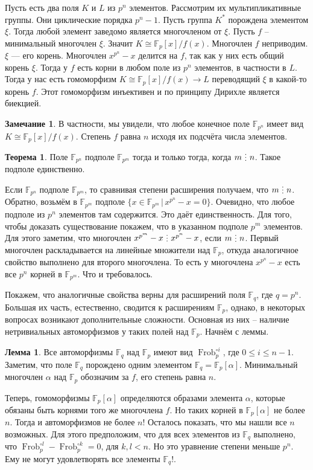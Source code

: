 \documentclass[10pt,a4paper,oneside]{book}
\theoremstyle{definition}
\newtheorem*{rem}{Замечание}
\newtheorem{thm}{{\color{red!40!black} Теорема}}
\newtheorem{lem}{Лемма}
\newcommand{\mb}[1]{\mathbb{#1}}
\newcommand{\Frob}{\operatorname{Frob}}
\newcommand{\di}{\mathop{\,\scalebox{0.85}{\raisebox{-1.2pt}[0.5\height]{\vdots}}\,}}
\def\thrm{\begin{thm}}
\def\ethrm{\end{thm}}
\def\lm{\begin{lem}}
\def\elm{\end{lem}}
\def\rm{\begin{rem}}
\def\erm{\end{rem}}
\begin{document}
Пусть есть два поля $K$ и $L$ из $p^n$ элементов. Рассмотрим их мультипликативные группы. Они циклические порядка $p^n-1$. Пусть группа $K^*$ порождена элементом $\xi$. Тогда любой элемент заведомо является многочленом от $\xi$. Пусть $f$ -- минимальный многочлен $\xi$. Значит $K\cong\mb F_p[x]/f(x)$. Многочлен $f$ неприводим. $\xi$ --- его корень. Многочлен $x^{p^n}-x$ делится на $f$, так как у них есть общий корень $\xi$. Тогда у $f$ есть корни в любом поле из $p^n$ элементов, в частности в $L$. Тогда у нас есть гомоморфизм  $K\cong\mb F_p[x]/f(x)\to L$ переводящий $\xi$ в какой-то корень $f$. Этот гомоморфизм инъективен и по принципу Дирихле является биекцией. 
\endproof

\rm В частности, мы увидели, что любое конечное поле $\mb F_{p^n}$ имеет вид $K\cong\mb F_p[x]/f(x)$. Степень $f$ равна $n$ исходя их подсчёта числа элементов.
\erm


\thrm Поле $\mb F_{p^n}$ подполе $\mb F_{p^m}$ тогда и только тогда, когда $m\di n$. Такое подполе единственно.
\ethrm 
\proof
Если $\mb F_{p^n}$ подполе $\mb F_{p^m}$, то сравнивая степени расширения получаем, что $m \di n$. Обратно, возьмём в $\mb F_{p^m}$ подполе $\{x \in \mb F_{p^m} \,|\, x^{p^n}-x=0\}$. Очевидно, что любое подполе из $p^n$ элементов там содержится. Это даёт единственность. Для того, чтобы доказать существование покажем, что в указанном подполе $p^m$ элементов. Для этого заметим, что многочлен $x^{p^m}-x \di x^{p^n}-x$, если $m \di n$. Первый многочлен раскладывается на линейные множители над $\mb F_p$, откуда аналогичное свойство выполнено для второго многочлена. То есть у многочлена $x^{p^n}-x$ есть все $p^n$ корней в $\mb F_{p^m}$. Что и требовалось. 
\endproof



Покажем, что аналогичные свойства верны для расширений поля $\mb F_q$, где $q=p^n$. Большая их часть, естественно, сводится к расширениям $\mb F_p$, однако, в некоторых вопросах возникают дополнительные сложности. Основная из них -- наличие нетривиальных автоморфизмов у таких полей над $\mb F_p$. Начнём с леммы.

\lm Все автоморфизмы $\mb F_q$ над $\mb F_p$ имеют вид $\Frob_p^{\circ i}$, где $0\leq i \leq n-1$. 
\proof Заметим, что поле $\mb F_q$ порождено одним элементом $\mb F_q =\mb F_p[\alpha]$. Минимальный многочлен $\alpha$ над $\mb F_p$ обозначим за $f$, его степень равна $n$. 

Теперь, гомоморфизмы $\mb F_p[\alpha]$ определяются образами элемента $\alpha$, которые обязаны быть корнями того же многочлена $f$. Но таких корней в $\mb F_p[\alpha]$ не более $n$. Тогда и автоморфизмов не более $n$! Осталось показать, что мы нашли все $n$ возможных. Для этого предположим, что для всех элементов из $\mb F_q$ выполнено, что $\Frob_p^{\circ l} - \Frob_p^{\circ k}=0$, для $k,l<n$. Но это уравнение степени меньше $p^n$. Ему не могут удовлетворять все элементы $\mb F_q$!. 
\endproof
\elm
\end{document}
